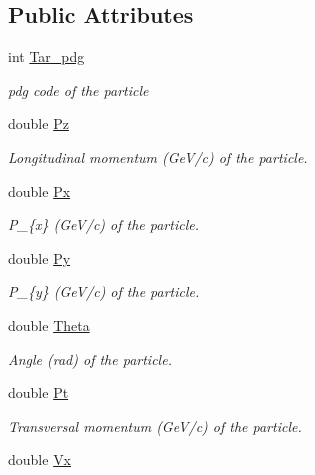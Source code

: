 \subsection*{Public Attributes}
\begin{DoxyCompactItemize}
\item 
int \hyperlink{class_neutrino_flux_reweight_1_1_target_data_add174a11bb396898c7ce99c6340b2c42}{Tar\-\_\-pdg}
\begin{DoxyCompactList}\small\item\em pdg code of the particle \end{DoxyCompactList}\item 
double \hyperlink{class_neutrino_flux_reweight_1_1_target_data_a1db5829fbf43b237acc8e9094746028c}{Pz}
\begin{DoxyCompactList}\small\item\em Longitudinal momentum (Ge\-V/c) of the particle. \end{DoxyCompactList}\item 
double \hyperlink{class_neutrino_flux_reweight_1_1_target_data_a8c905649babb8529ba1d6364c660d41f}{Px}
\begin{DoxyCompactList}\small\item\em P\-\_\-\{x\} (Ge\-V/c) of the particle. \end{DoxyCompactList}\item 
double \hyperlink{class_neutrino_flux_reweight_1_1_target_data_a78fe35cea817ad13f0c68c6cd4b66b4a}{Py}
\begin{DoxyCompactList}\small\item\em P\-\_\-\{y\} (Ge\-V/c) of the particle. \end{DoxyCompactList}\item 
double \hyperlink{class_neutrino_flux_reweight_1_1_target_data_ac9cde1eb7d38015d22bb4004dc78a145}{Theta}
\begin{DoxyCompactList}\small\item\em Angle (rad) of the particle. \end{DoxyCompactList}\item 
double \hyperlink{class_neutrino_flux_reweight_1_1_target_data_a80699c279341622734429a019e6b8439}{Pt}
\begin{DoxyCompactList}\small\item\em Transversal momentum (Ge\-V/c) of the particle. \end{DoxyCompactList}\item 
double \hyperlink{class_neutrino_flux_reweight_1_1_target_data_aaeed3ae4abbd85643b22e100c29ca54e}{Vx}

\end{DoxyCompactItemize}
